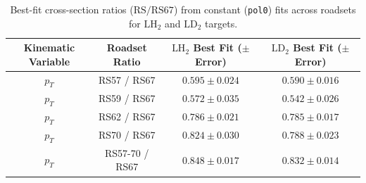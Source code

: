 \begin{table}[htbp]
\centering
\caption{Best-fit cross-section ratios ($\text{RS} / \text{RS67}$) from constant (\texttt{pol0}) fits across roadsets for $\text{LH}_2$ and $\text{LD}_2$ targets.}
\label{tab:xsec_ratios_vs_rs67_previous}
\begin{tabular}{|c|c|c|c|}
\hline
\textbf{Kinematic Variable} & \textbf{Roadset Ratio} & \textbf{$\text{LH}_2$ Best Fit ($\pm$ Error)} & \textbf{$\text{LD}_2$ Best Fit ($\pm$ Error)} \\
\hline
$p_T$ & RS57 / RS67 & $0.595 \pm 0.024$ & $0.590 \pm 0.016$ \\
\hline
$p_T$ & RS59 / RS67 & $0.572 \pm 0.035$ & $0.542 \pm 0.026$ \\
\hline
$p_T$ & RS62 / RS67 & $0.786 \pm 0.021$ & $0.785 \pm 0.017$ \\
\hline
$p_T$ & RS70 / RS67 & $0.824 \pm 0.030$ & $0.788 \pm 0.023$ \\
\hline
$p_T$ & RS57-70 / RS67 & $0.848 \pm 0.017$ & $0.832 \pm 0.014$ \\
\hline
\end{tabular}
\end{table}
